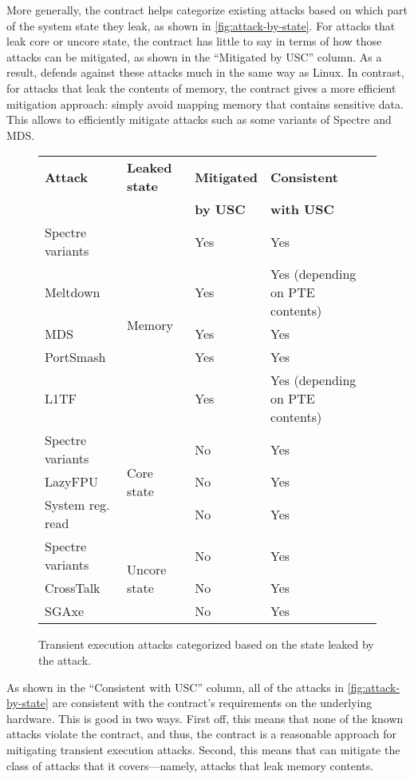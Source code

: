 More generally, the contract helps categorize existing attacks
based on which part of the system state they leak, as shown in
\autoref{fig:attack-by-state}.  For attacks that leak core or uncore
state, the contract has little to say in terms of how those attacks
can be mitigated, as shown in the ``Mitigated by USC'' column.  As a
result, \sys defends against these attacks much in the same way as Linux.
In contrast, for attacks that leak the contents of memory, the contract
gives a more efficient mitigation approach: simply avoid mapping memory
that contains sensitive data.  This allows \sys to efficiently mitigate
attacks such as some variants of Spectre and MDS.

\begin{figure}
\small
\centering
\begin{tabular}{@{}llll@{}}
\textbf{Attack} & \textbf{Leaked state} & \textbf{Mitigated} & \textbf{Consistent} \\
&& \textbf{by USC} & \textbf{with USC} \\
\midrule

Spectre variants & \multirow{5}{0.75in}{Memory} & Yes & Yes\\
Meltdown & & Yes & Yes (depending on PTE contents)\\
MDS & & Yes & Yes\\
PortSmash & & Yes & Yes\\
L1TF & & Yes & Yes (depending on PTE contents)\\

\midrule

Spectre variants & \multirow{3}{0.75in}{Core state} & No & Yes \\
LazyFPU & & No & Yes \\
System reg. read & & No & Yes \\

\midrule

Spectre variants & \multirow{3}{0.75in}{Uncore state} & No & Yes \\
CrossTalk & & No & Yes \\
SGAxe & & No & Yes \\

\end{tabular}
\caption{Transient execution attacks categorized based on the
  state leaked by the attack.}
\label{fig:attack-by-state}
\end{figure}

As shown in the ``Consistent with USC'' column, all of the attacks
in \autoref{fig:attack-by-state} are consistent with the contract's
requirements on the underlying hardware.  This is good in two ways.
First off, this means that none of the known attacks violate the contract,
and thus, the contract is a reasonable approach for mitigating transient
execution attacks.  Second, this means that \contract can mitigate
the class of attacks that it covers---namely, attacks that leak memory
contents.

